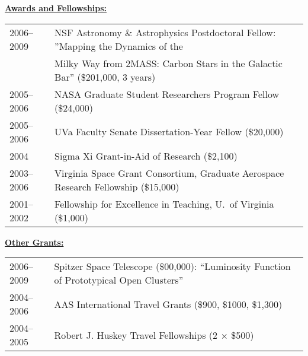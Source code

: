 \documentclass[12pt]{article}
\begin{document}
\noindent \underline{\bf Awards and Fellowships:} \\
\begin{tabular}{ll}
2006--2009 &NSF Astronomy \& Astrophysics Postdoctoral Fellow: ''Mapping the Dynamics of the  \\ 
           &Milky Way from 2MASS: Carbon Stars in the Galactic Bar'' (\$201,000, 3 years) \\
2005--2006 &NASA Graduate Student Researchers Program Fellow (\$24,000)\\
2005--2006 &UVa Faculty Senate Dissertation-Year Fellow (\$20,000) \\
2004       &Sigma Xi Grant-in-Aid of Research (\$2,100) \\
2003--2006 &Virginia Space Grant Consortium, Graduate Aerospace Research Fellowship (\$15,000) \\
2001--2002 &Fellowship for Excellence in Teaching, U.\ of Virginia (\$1,000) \\ %
\end{tabular}
\vskip 0.03in
\noindent \underline{\bf Other Grants:}\\
\begin{tabular}{ll}
2006--2009 &Spitzer Space Telescope (\$00,000): ``Luminosity Function of Prototypical Open Clusters''\\
2004--2006 &AAS International Travel Grants  (\$900, \$1000, \$1,300) \\
2004--2005 &Robert J. Huskey Travel Fellowships (2 $\times$ \$500) \\
\end{tabular}
\vskip 0.05in
\end{document}
